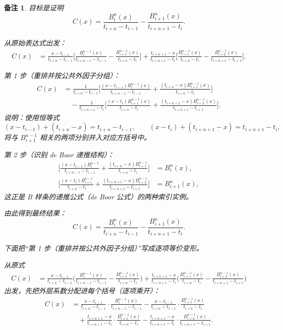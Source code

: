 \documentclass[a4paper]{ctexart}
\newtheorem*{remark*}{备注}
\numberwithin{theorem}{section}
\numberwithin{equation}{section}
\numberwithin{figure}{section}
\numberwithin{remark}{section}
\begin{document}
\begin{remark*}
目标是证明
\[
C(x)=\frac{B^{n}_i(x)}{t_{i+n}-t_{i-1}}-\frac{B^{n}_{i+1}(x)}{t_{i+n+1}-t_i}.
\]

从原始表达式出发：
\begin{align*}
C(x)
&=\frac{x-t_{i-1}}{t_{i+n}-t_{i-1}}
\Biggl[
\frac{B^{n-1}_i(x)}{t_{i+n-1}-t_{i-1}}-\frac{B^{n-1}_{i+1}(x)}{t_{i+n}-t_i}
\Biggr]
+\frac{t_{i+n+1}-x}{t_{i+n+1}-t_i}
\Biggl[
\frac{B^{n-1}_{i+1}(x)}{t_{i+n}-t_i}-\frac{B^{n-1}_{i+2}(x)}{t_{i+n+1}-t_{i+1}}
\Biggr].
\end{align*}

第 1 步（重排并按公共外因子分组）：
\begin{align*}
C(x)
&=\frac{1}{t_{i+n}-t_{i-1}}
\Biggl[
\frac{(x-t_{i-1})B^{n-1}_i(x)}{t_{i+n-1}-t_{i-1}}
+\frac{(t_{i+n}-x)B^{n-1}_{i+1}(x)}{t_{i+n}-t_i}
\Biggr]\\
&\quad-\frac{1}{t_{i+n+1}-t_i}
\Biggl[
\frac{(x-t_i)B^{n-1}_{i+1}(x)}{t_{i+n}-t_i}
+\frac{(t_{i+n+1}-x)B^{n-1}_{i+2}(x)}{t_{i+n+1}-t_{i+1}}
\Biggr].
\end{align*}
说明：使用恒等式
\[
(x-t_{i-1})+(t_{i+n}-x)=t_{i+n}-t_{i-1},\qquad
(x-t_i)+(t_{i+n+1}-x)=t_{i+n+1}-t_i,
\]
将与 $B^{n-1}_{i+1}$ 相关的两项分别并入对应方括号中。

第 2 步（识别 de Boor 递推结构）：
\begin{align*}
\Biggl[
\frac{(x-t_{i-1})B^{n-1}_i}{t_{i+n-1}-t_{i-1}}
+\frac{(t_{i+n}-x)B^{n-1}_{i+1}}{t_{i+n}-t_i}
\Biggr]&=B^{n}_i(x),\\
\Biggl[
\frac{(x-t_i)B^{n-1}_{i+1}}{t_{i+n}-t_i}
+\frac{(t_{i+n+1}-x)B^{n-1}_{i+2}}{t_{i+n+1}-t_{i+1}}
\Biggr]&=B^{n}_{i+1}(x),
\end{align*}
这正是 B 样条的递推公式（de Boor 公式）的两种索引实例。

由此得到最终结果：
\[
C(x)=\frac{B^{n}_i(x)}{t_{i+n}-t_{i-1}}-\frac{B^{n}_{i+1}(x)}{t_{i+n+1}-t_i}.
\]    

下面把“第 1 步（重排并按公共外因子分组）”写成逐项等价变形。

从原式
\[
\begin{aligned}
C(x)
&=\frac{x-t_{i-1}}{t_{i+n}-t_{i-1}}
\Biggl(
\frac{B^{n-1}_i(x)}{t_{i+n-1}-t_{i-1}}
-\frac{B^{n-1}_{i+1}(x)}{t_{i+n}-t_i}
\Biggr)
+\frac{t_{i+n+1}-x}{t_{i+n+1}-t_i}
\Biggl(
\frac{B^{n-1}_{i+1}(x)}{t_{i+n}-t_i}
-\frac{B^{n-1}_{i+2}(x)}{t_{i+n+1}-t_{i+1}}
\Biggr)
\end{aligned}
\]
出发，先把外层系数分配进每个括号（逐项乘开）：
\[
\begin{aligned}
C(x)
&=\frac{x-t_{i-1}}{t_{i+n}-t_{i-1}}\cdot
\frac{B^{n-1}_i(x)}{t_{i+n-1}-t_{i-1}}
-\frac{x-t_{i-1}}{t_{i+n}-t_{i-1}}\cdot
\frac{B^{n-1}_{i+1}(x)}{t_{i+n}-t_i} \\
&\quad+\frac{t_{i+n+1}-x}{t_{i+n+1}-t_i}\cdot
\frac{B^{n-1}_{i+1}(x)}{t_{i+n}-t_i}
-\frac{t_{i+n+1}-x}{t_{i+n+1}-t_i}\cdot
\frac{B^{n-1}_{i+2}(x)}{t_{i+n+1}-t_{i+1}}.
\end{aligned}
\]


\end{remark*}
\end{document}
